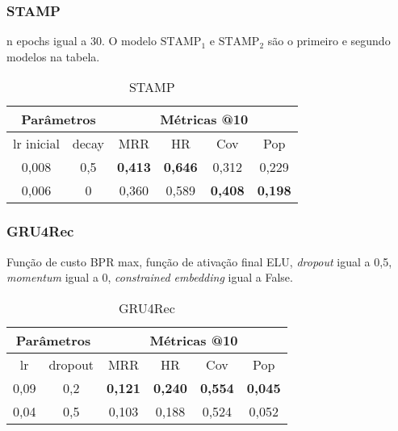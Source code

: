 \subsubsection{STAMP}

n epochs igual a 30. O modelo $\text{STAMP}_{1}$ e $\text{STAMP}_{2}$
são o primeiro e segundo modelos na tabela.

\begin{table}[htbp]
  \centering
  \begin{tabular}{|c|c|c|c|c|c|}
    \hline
      \multicolumn{2}{|c|}{Parâmetros} & \multicolumn{4}{c|}{Métricas @10} \\
      \hline
      lr inicial & decay & MRR & HR & Cov & Pop \\
      \hline
      0,008 & 0,5 & \textbf{0,413} & \textbf{0,646} & 0,312 & 0,229 \\
      \hline
      0,006 & 0 & 0,360 & 0,589 & \textbf{0,408} & \textbf{0,198} \\
      \hline
    \end{tabular}
    \caption{STAMP}
\end{table}


\subsubsection{GRU4Rec}


Função de custo BPR max, função de ativação final ELU, \textit{dropout} igual a 0,5,
\textit{momentum} igual a 0, \textit{constrained embedding} igual a False.
\begin{table}[htbp]
  \centering
  \begin{tabular}{|c|c|c|c|c|c|}
    \hline
      \multicolumn{2}{|c|}{Parâmetros} & \multicolumn{4}{c|}{Métricas @10} \\
      \hline
      lr  & dropout & MRR & HR & Cov & Pop \\
      \hline
      0,09  & 0,2 & \textbf{0,121} & \textbf{0,240} & \textbf{0,554} & \textbf{0,045} \\
      \hline
      0,04  & 0,5 & 0,103 & 0,188 & 0,524 & 0,052 \\
      \hline
    \end{tabular}
    \caption{GRU4Rec}
\end{table}



